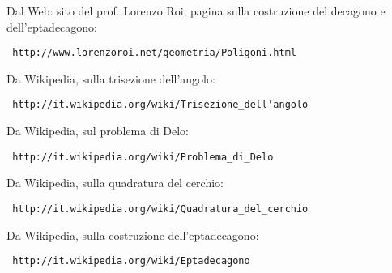 \begin{thebibliography}{21}
Dal Web: sito del prof. Lorenzo Roi, pagina sulla costruzione del decagono e dell'eptadecagono: \begin{verbatim} http://www.lorenzoroi.net/geometria/Poligoni.html \end{verbatim}

Da Wikipedia, sulla trisezione dell'angolo: \begin{verbatim} http://it.wikipedia.org/wiki/Trisezione_dell'angolo \end{verbatim}

Da Wikipedia, sul problema di Delo: \begin{verbatim} http://it.wikipedia.org/wiki/Problema_di_Delo \end{verbatim}

Da Wikipedia, sulla quadratura del cerchio: \begin{verbatim} http://it.wikipedia.org/wiki/Quadratura_del_cerchio \end{verbatim}

Da Wikipedia, sulla costruzione dell'eptadecagono: \begin{verbatim} http://it.wikipedia.org/wiki/Eptadecagono \end{verbatim}

\end{thebibliography}